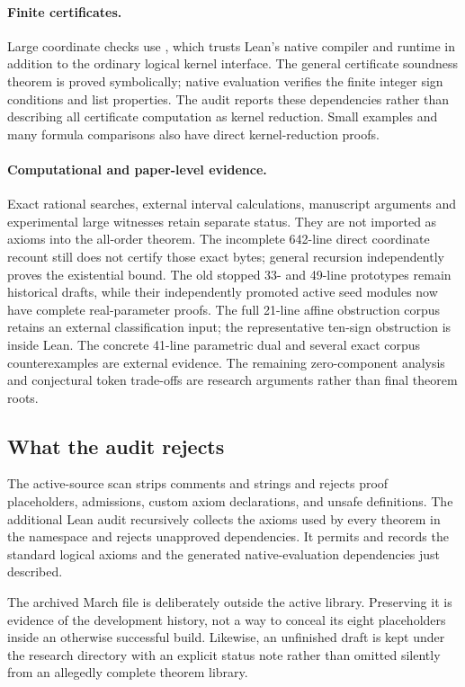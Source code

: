 \paragraph{Finite certificates.}
Large coordinate checks use , which trusts Lean's native compiler and runtime in addition to the ordinary logical kernel interface. The general certificate soundness theorem is proved symbolically; native evaluation verifies the finite integer sign conditions and list properties. The audit reports these dependencies rather than describing all certificate computation as kernel reduction. Small examples and many formula comparisons also have direct kernel-reduction proofs.

\paragraph{Computational and paper-level evidence.}
Exact rational searches, external interval calculations, manuscript
arguments and experimental large witnesses retain separate status.
They are not imported as axioms into the all-order theorem. The
incomplete 642-line direct coordinate recount still does not certify
those exact bytes; general recursion independently proves the existential
bound. The old stopped 33- and 49-line prototypes remain historical
drafts, while their independently promoted active seed modules now have
complete real-parameter proofs. The full 21-line affine obstruction
corpus retains an external classification input; the representative
ten-sign obstruction is inside Lean. The concrete 41-line parametric
dual and several exact corpus counterexamples are external evidence.
The remaining zero-component analysis and conjectural token trade-offs
are research arguments rather than final theorem roots.

\subsection{What the audit rejects}

The active-source scan strips comments and strings and rejects proof placeholders, admissions, custom axiom declarations, and unsafe definitions. The additional Lean audit recursively collects the axioms used by every theorem in the  namespace and rejects unapproved dependencies. It permits and records the standard logical axioms and the generated native-evaluation dependencies just described.

The archived March file is deliberately outside the active library. Preserving it is evidence of the development history, not a way to conceal its eight placeholders inside an otherwise successful build. Likewise, an unfinished draft is kept under the research directory with an explicit status note rather than omitted silently from an allegedly complete theorem library.

